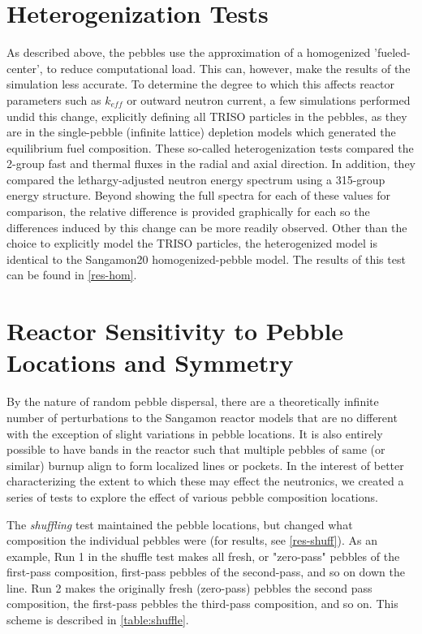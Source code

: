 \section{Heterogenization Tests}
\label{het-test-meth}

As described above, the pebbles use the approximation of a homogenized 'fueled-center', to reduce computational load.  This can, however, make the results of the simulation less accurate.  To determine the degree to which this affects reactor parameters such as $k_{eff}$ or outward neutron current, a few simulations performed undid this change, explicitly defining all TRISO particles in the pebbles, as they are in the single-pebble (infinite lattice) depletion models which generated the equilibrium fuel composition.  These so-called heterogenization tests compared the 2-group fast and thermal fluxes in the radial and axial direction.  In addition, they compared the lethargy-adjusted neutron energy spectrum using a 315-group energy structure.  Beyond showing the full spectra for each of these values for comparison, the relative difference is provided graphically for each so the differences induced by this change can be more readily observed.  Other than the choice to explicitly model the TRISO particles, the heterogenized model is identical to the Sangamon20 homogenized-pebble model.  The results of this test can be found in \autoref{res-hom}.

\section{Reactor Sensitivity to Pebble Locations and Symmetry}
\label{meth-sens}

By the nature of random pebble dispersal, there are a theoretically infinite number of perturbations to the Sangamon reactor models that are no different with the exception of slight variations in pebble locations.  It is also entirely possible to have bands in the reactor such that multiple pebbles of same (or similar) burnup align to form localized lines or pockets.  In the interest of better characterizing the extent to which these may effect the neutronics, we created a series of tests to explore the effect of various pebble composition locations.  

The \emph{shuffling} test maintained the pebble locations, but changed what composition the individual pebbles were (for results, see \autoref{res-shuff}).  As an example, Run 1 in the shuffle test makes all fresh, or "zero-pass" pebbles of the first-pass composition, first-pass pebbles of the second-pass, and so on down the line.  Run 2 makes the originally fresh (zero-pass) pebbles the second pass composition, the first-pass pebbles the third-pass composition, and so on. This scheme is described in \ref{table:shuffle}.

